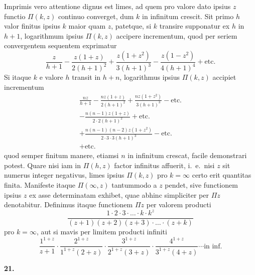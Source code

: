 \documentclass[12pt,a4paper]{article}
\newcommand{\art}[1]{\par\medskip\noindent\textbf{#1.}\par\nopagebreak\smallskip}
\begin{document}
Imprimis vero attentione dignus est limes, ad quem pro valore dato ipsius $z$ functio $\Pi(k,z)$ continuo converget, dum $k$ in infinitum crescit. Sit primo $h$ valor finitus ipsius $k$ maior quam $z$, patetque, si $k$ transire supponatur ex $h$ in $h+1$, logarithmum ipsius $\Pi(k,z)$ accipere incrementum, quod per seriem convergentem sequentem exprimatur
\[
\frac{z}{h+1} - \frac{z(1+z)}{2(h+1)^2} + \frac{z(1+z^2)}{3(h+1)^3} - \frac{z(1-z^2)}{4(h+1)^4} + \text{etc.}
\]
Si itaque $k$ e valore $h$ transit in $h+n$, logarithmus ipsius $\Pi(k,z)$ accipiet incrementum
\begin{multline*}
\frac{nz}{h+1} - \frac{nz(1+z)}{2(h+1)^2} + \frac{nz(1+z^2)}{3(h+1)^3} - \text{etc.}\\
- \frac{n(n-1)z(1+z)}{2\cdot2(h+1)^2} + \text{etc.}\\
+ \frac{n(n-1)(n-2)z(1+z^2)}{2\cdot3\cdot3(h+1)^3} - \text{etc.}\\
+ \text{etc.}
\end{multline*}
quod semper finitum manere, etiamsi $n$ in infinitum crescat, facile demonstrari potest. Quare nisi iam in $\Pi(h,z)$ factor infinitus affuerit, i.\ e.\ nisi $z$ sit numerus integer negativus, limes ipsius $\Pi(k,z)$ pro $k=\infty$ certo erit quantitas finita. Manifeste itaque $\Pi(\infty,z)$ tantummodo a $z$ pendet, sive functionem ipsius $z$ ex asse determinatam exhibet, quae abhinc simpliciter per $\Pi z$ denotabitur. Definimus itaque functionem $\Pi z$ per valorem producti
\[
\frac{1\cdot2\cdot3\cdot\ldots\cdot k\cdot k^z}{(z+1)(z+2)(z+3)\cdot\ldots\cdot(z+k)}
\]
pro $k=\infty$, aut si mavis per limitem producti infiniti
\begin{equation}
\frac{1^{1+z}}{z+1}\cdot\frac{2^{1+z}}{1^{1+z}(2+z)}\cdot\frac{3^{1+z}}{2^{1+z}(3+z)}\cdot\frac{4^{1+z}}{3^{1+z}(4+z)}\cdots\text{in inf.}\tag{[43]}
\end{equation}

\art{21}
\end{document}
